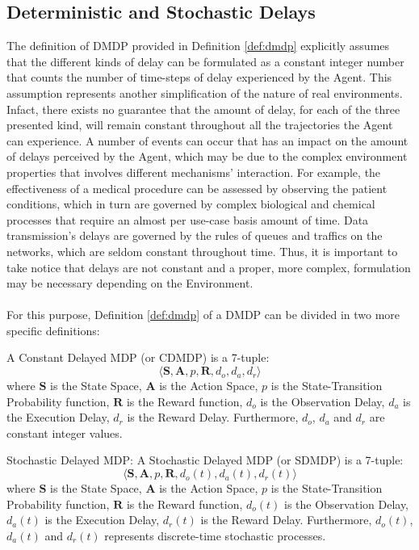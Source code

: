         \subsection{Deterministic and Stochastic Delays}
        \label{sub:dmdp_stochdelays}
            The definition of DMDP provided in Definition \ref{def:dmdp} explicitly assumes that the different kinds of delay can be formulated as a constant integer number that counts the number of time-steps of delay experienced by the Agent. This assumption represents another simplification of the nature of real environments. Infact, there exists no guarantee that the amount of delay, for each of the three presented kind, will remain constant throughout all the trajectories the Agent can experience. \newline
            A number of events can occur that has an impact on the amount of delays perceived by the Agent, which may be due to the complex environment properties that involves different mechanisms' interaction. For example, the effectiveness of a medical procedure can be assessed by observing the patient conditions, which in turn are governed by complex biological and chemical processes that require an almost per use-case basis amount of time. Data transmission's delays are governed by the rules of queues and traffics on the networks, which are seldom constant throughout time. Thus, it is important to take notice that delays are not constant and a proper, more complex, formulation may be necessary depending on the Environment. 
            \\\\
            For this purpose, Definition \ref{def:dmdp} of a DMDP can be divided in two more specific definitions:
            
            \begin{definition}
                \label{def:cdmdp}
                A Constant Delayed MDP (or CDMDP) is a 7-tuple:
                \[ \langle \mathbf{S}, \mathbf{A}, p, \mathbf{R}, d_o, d_a, d_r \rangle\]
                where $\mathbf{S}$ is the State Space, $\mathbf{A}$ is the Action Space, $p$ is the State-Transition Probability function, $\mathbf{R}$ is the Reward function, $d_o$ is the Observation Delay, $d_a$ is the Execution Delay, $d_r$ is the Reward Delay. Furthermore, $d_o$, $d_a$ and $d_r$ are constant integer values.
            \end{definition}
            
            \begin{definition}{Stochastic Delayed MDP: }
                \label{def:sdmdp}
                A Stochastic Delayed MDP (or SDMDP) is a 7-tuple:
                \[ \langle \mathbf{S}, \mathbf{A}, p, \mathbf{R}, d_o(t), d_a(t), d_r(t) \rangle\]
                where $\mathbf{S}$ is the State Space, $\mathbf{A}$ is the Action Space, $p$ is the State-Transition Probability function, $\mathbf{R}$ is the Reward function, $d_o(t)$ is the Observation Delay, $d_a(t)$ is the Execution Delay, $d_r(t)$ is the Reward Delay. Furthermore, $d_o(t)$, $d_a(t)$ and $d_r(t)$ represents discrete-time stochastic processes.
            \end{definition}
            
